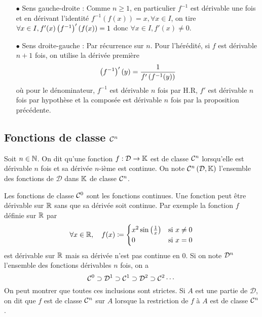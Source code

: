 \documentclass{magnoliaold}
\begin{document}
\begin{preuve}
  \begin{itemize}
  \item[$\bullet$] Sens gauche-droite : Comme $n\geq 1$, en particulier $f^{-1}$ est dérivable une fois et en dérivant l'identité $f^{-1}(f(x))=x, \forall x \in I$, on tire $\forall x \in I, f'(x)\left(f^{-1}\right)'(f(x))=1$ donc $\forall x \in I, f'(x)\neq 0$.
  \item[$\bullet$] Sens droite-gauche : Par récurrence sur $n$. Pour l'hérédité, si $f$ est dérivable $n+1$ fois, on utilise la dérivée première $$\left(f^{-1}\right)'(y)=\frac{1}{f'\left(f^{-1}(y)\right)}$$ où pour le dénominateur, $f^{-1}$ est dérivable $n$ fois par H.R, $f'$ est dérivable $n$ fois par hypothèse et la composée est dérivable $n$ fois par la proposition précédente. 
  \end{itemize}
  \end{preuve}


\subsection{Fonctions de classe $\mathcal{C}^{n}$}

\begin{definition}[utile=-3]
Soit $n\in\mathbb{N}$. On dit qu'une fonction $f:\mathcal{D}\to\mathbb{K}$ est de classe $\mathcal{C}^{n}$
lorsqu'elle est dérivable $n$ fois et sa dérivée $n$-ième est continue. On note
$\mathcal{C}^{n}\left(\mathcal{D},\mathbb{K}\right)$  l'ensemble des fonctions de $\mathcal{D}$
dans $\mathbb{K}$ de classe $\mathcal{C}^{n}$.
\end{definition}

\begin{remarques}
\remarque Les fonctions de classe $\mathcal{C}^{0}$ sont les fonctions continues.
\remarque Une fonction peut être dérivable sur $\mathbb{R}$ sans que sa dérivée soit
  continue. Par exemple la fonction $f$ définie sur $\mathbb{R}$ par
  \[\forall x\in\mathbb{R} ,\quad f(x)\coloneqq
    \begin{cases}
    x^2\sin\left(\frac{1}{x}\right) & \text{si $x\neq 0$}\\
    0 & \text{si $x=0$}
    \end{cases}\]
  est dérivable sur $\mathbb{R}$ mais sa dérivée n'est pas continue en 0.
\remarque Si on note $\mathcal{D}^{n}$ l'ensemble des fonctions dérivables $n$
  fois, on a
  \[\mathcal{C}^{0} \supset \mathcal{D}^{1} \supset \mathcal{C}^{1} \supset \mathcal{D}^{2}
    \supset \mathcal{C}^{2} \cdots \]
  On peut montrer que toutes ces inclusions sont strictes.
\remarque Si $A$ est une partie de $\mathcal{D}$, on dit que $f$ est de
  classe $\mathcal{C}^{n}$ sur $A$ lorsque la restriction de $f$ à $A$
  est de classe $\mathcal{C}^{n}$.
\end{remarques}
\end{document}
